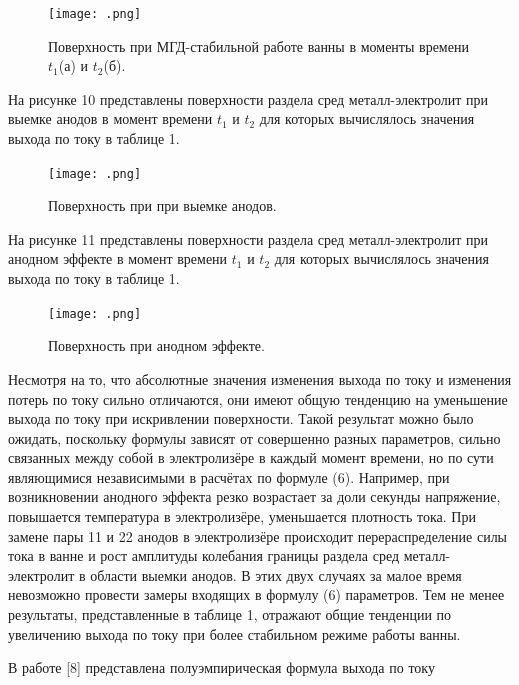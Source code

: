 \documentclass{article}
\begin{document}

\begin{figure}[h!]
    \centering
    \texttt{[image: .png]}
    \caption{Поверхность при МГД-стабильной работе ванны в моменты времени $t_1$(а) и $t_2$(б).}
    \label{fig:} 
\end{figure}

На рисунке 10 представлены поверхности раздела сред металл-электролит при выемке анодов в момент времени $t_1$ и $t_2$ для которых вычислялось значения выхода по току в таблице 1.

\begin{figure}[h!]
    \centering
    \texttt{[image: .png]}
    \caption{Поверхность при при выемке анодов.}
    \label{fig:} 
\end{figure}

На рисунке 11 представлены поверхности раздела сред металл-электролит при анодном эффекте в момент времени $t_1$ и $t_2$ для которых вычислялось значения выхода по току в таблице 1.

\begin{figure}[h!]
    \centering
    \texttt{[image: .png]}
    \caption{Поверхность при анодном эффекте.}
    \label{fig:} 
\end{figure}

Несмотря на то, что абсолютные значения изменения выхода по току и изменения потерь по току сильно отличаются, они имеют общую тенденцию на уменьшение выхода по току при искривлении поверхности. Такой результат можно было ожидать, поскольку формулы зависят от совершенно разных параметров, сильно связанных между собой в электролизёре в каждый момент времени, но по сути являющимися независимыми в расчётах по формуле (6). Например, при возникновении анодного эффекта резко возрастает за доли секунды напряжение, повышается температура в электролизёре, уменьшается плотность тока. При замене пары 11 и 22 анодов в электролизёре происходит перераспределение силы тока в ванне и рост амплитуды колебания границы раздела сред металл-электролит в области выемки анодов. В этих двух случаях за малое время невозможно провести замеры входящих в формулу (6) параметров. Тем не менее результаты, представленные в таблице 1, отражают общие тенденции по увеличению выхода по току при более стабильном режиме работы ванны.

В работе [8] представлена полуэмпирическая формула выхода по току

%
\end{document}
